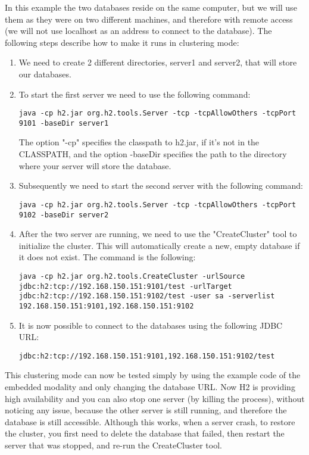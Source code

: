 In this example the two databases reside on the same computer, but we will use them as they were on two different machines, and therefore with remote access (we will not use localhost as an address to connect to the database). The following steps describe how to make it runs in clustering mode:
\begin{enumerate}
	\item We need to create 2 different directories, server1 and server2, that will store our databases.
	\item To start the first server we need to use the following command: 
\begin{lstlisting}[commentstyle=\color{black}]
java -cp h2.jar org.h2.tools.Server -tcp -tcpAllowOthers -tcpPort 9101 -baseDir server1
\end{lstlisting}
The option "-cp" specifies the classpath to h2.jar, if it's not in the CLASSPATH, and the option -baseDir specifies the path to the directory where your server will store the database.
	\item Subsequently we need to start the second server with the following command:
\begin{lstlisting}[commentstyle=\color{black}]
java -cp h2.jar org.h2.tools.Server -tcp -tcpAllowOthers -tcpPort 9102 -baseDir server2
\end{lstlisting}
	\item After the two server are running, we need to use the "CreateCluster" tool to initialize the cluster. This will automatically create a new, empty database if it does not exist. The command is the following: 	
\begin{lstlisting}[commentstyle=\color{black}]
java -cp h2.jar org.h2.tools.CreateCluster -urlSource jdbc:h2:tcp://192.168.150.151:9101/test -urlTarget jdbc:h2:tcp://192.168.150.151:9102/test -user sa -serverlist 192.168.150.151:9101,192.168.150.151:9102
\end{lstlisting}
	\item It is now possible to connect to the databases using the following JDBC URL: 
\begin{lstlisting}[commentstyle=\color{black}]
jdbc:h2:tcp://192.168.150.151:9101,192.168.150.151:9102/test
\end{lstlisting}
\end{enumerate}

This clustering mode can now be tested simply by using the example code of the embedded modality and only changing the database URL. Now H2 is providing high availability and you can also stop one server (by killing the process), without noticing any issue, because the other server is still running, and therefore the database is still accessible. Although this works, when a server crash, to restore the cluster, you first need to delete the database that failed, then restart the server that was stopped, and re-run the CreateCluster tool. 
			
